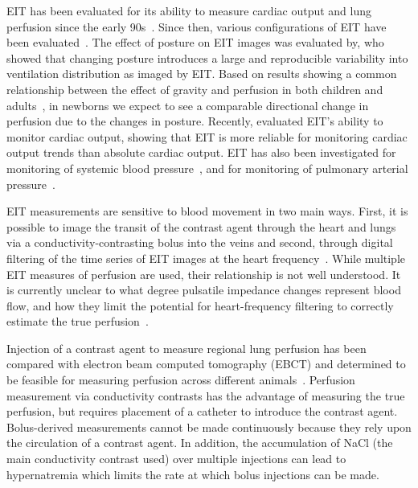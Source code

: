 EIT has been evaluated for its ability to measure cardiac output and
lung perfusion since the early 90s~\parencite{eyuboglu_vivo_1989,zadehkoochak_pulmonary_1992,frerichs_regional_2002}.
Since then, various configurations of EIT have been evaluated~\parencite{borges_regional_2012,nguyen_perfusion_2015}.
The effect of posture on EIT images
was evaluated by, who showed that changing posture
introduces a large and reproducible variability into ventilation distribution as imaged by EIT.
Based on results showing a common relationship between the effect of gravity and perfusion in both children and
adults~\parencite{bhuyan_effects_1989},
in newborns we expect to see a comparable directional change in perfusion due to the changes in
posture.
Recently, evaluated EIT's ability to monitor
cardiac output, showing that EIT is more reliable for monitoring
cardiac output trends than absolute cardiac output.
EIT has also been investigated for
monitoring of systemic blood pressure~\parencite{sola_non-invasive_2011}, and 
for monitoring of pulmonary arterial pressure~\parencite{proenca_noninvasive_2017}.

EIT measurements are sensitive to blood movement in
two main ways. First, it is possible to image the transit of the
contrast agent through the heart and lungs via a conductivity-contrasting
bolus into the veins and second, through
digital filtering of the time series of EIT images at the heart
frequency~\parencite{leathard_comparison_1994}.
While multiple EIT measures of perfusion are used, their relationship is 
not well understood.
It is currently unclear to what degree pulsatile impedance changes
represent blood flow, and how
they limit the potential for heart-frequency filtering to correctly estimate
the true perfusion~\parencite{nguyen_review_2012}.

Injection of a contrast agent to measure regional lung perfusion has been compared with 
electron beam computed tomography (EBCT) and determined to be feasible 
for measuring perfusion across different animals~\parencite{frerichs_regional_2002}.
Perfusion measurement via conductivity contrasts has the advantage of measuring the true perfusion,
but requires placement of a catheter to 
introduce the contrast agent.
Bolus-derived measurements cannot be made continuously because they rely
upon the circulation of a contrast agent. In addition, 
the accumulation of NaCl (the main conductivity contrast used)
over multiple injections
can lead to hypernatremia which limits the rate at which bolus
injections can be made.
 
